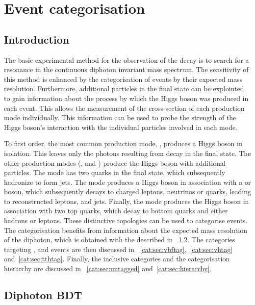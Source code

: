 \chapter{Event categorisation}
\label{chap:categorisation}

\section{Introduction}
\label{cat:sec:intro}

The basic experimental method for the observation of the \Hgg decay is to search for a resonance in the continuous \SM diphoton invariant mass spectrum. The sensitivity of this method is enhanced by the categorisation of events by their expected mass resolution. Furthermore, additional particles in the final state can be explointed to gain information about the process by which the Higgs boson was produced in each event. This allows the measurement of the cross-section of each production mode individually. This information can be used to probe the strength of the Higgs boson's interaction with the individual particles involved in each mode. %

To first order, the most common production mode, \ggH, produces a Higgs boson in isolation. This leaves only the photons resulting from \Hgg decay in the final state. The other production modes (\VBF, \VH and \ttH) produce the Higgs boson with additional particles. The \VBF mode has two quarks in the final state, which subsequently hadronize to form jets. The \VH mode produces a Higgs boson in association with a \PW or \PZ boson, which subsequently decays to charged leptons, neutrinos or quarks, leading to reconstructed leptons, \MET and jets. Finally, the \ttH mode produces the Higgs boson in association with two top quarks, which decay to bottom quarks and either hadrons or leptons. These distinctive topologies can be used to categorise events. The categorisation benefits from information about the expected mass resolution of the diphoton, which is obtained with the \BDT described in \Sec~\ref{cat:sec:dipho_bdt}. The categories targeting \VBF, \VH and \ttH events are then discussed in \Sec\s~\ref{cat:sec:vbftag},~\ref{cat:sec:vhtag} and~\ref{cat:sec:tthtag}. Finally, the inclusive \Untagged categories and the categorisation hierarchy are discussed in \Sec\s~\ref{cat:sec:untagged} and~\ref{cat:sec:hierarchy}.

\section{Diphoton BDT}
\label{cat:sec:dipho_bdt}

